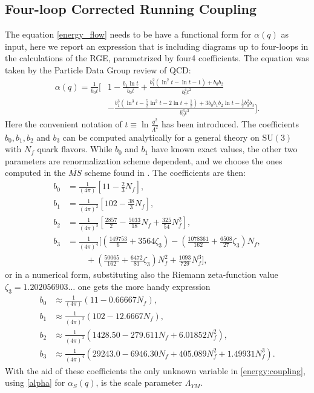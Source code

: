 \subsection{Four-loop Corrected Running Coupling}
\label{sec:4loop}
The equation \cref{energy_flow} needs to be have a functional form for $\alpha(q)$ as input, here we report an expression that is including diagrams up to four-loops in the calculations of the RGE, parametrized by four4 coefficients. The equation was taken by the Particle Data Group review of QCD\cite{dissertori_9._2016-1}:
\begin{align}
    \label{alpha}
    \alpha(q) = \frac{1}{b_0t} \bigg[& 1 - \frac{b_1\ln t}{b_0t}  + \frac{b_1^2(\ln^2t - \ln t - 1) + b_0b_2}{b_0^4t^2}\\\nonumber
    & - \frac{b_1^3(\ln^3t - \frac{5}{2}\ln^2 t - 2\ln t + \frac{1}{2}) + 3b_0b_1b_2\ln t - \frac{1}{2}b_0^2b_3}{b_0^6t^3}\bigg].
\end{align}
Here the convenient notation of $t\equiv\ln\frac{q^2}{\Lambda^2}$ has been introduced. The coefficients $b_0, b_1,b_2$ and $b_3$ can be computed analytically for a general theory on $\mathrm{SU}(3)$ with $N_f$ quark flavors. While $b_0$ and $b_1$ have known exact values, the other two parameters are renormalization scheme dependent, and we choose the ones computed in the $\overline{MS}$ scheme found in \cite{van_ritbergen_four-loop_1997}. The coefficients are then: 
\begin{align}
    b_0 &= \frac{1}{(4\pi)}   \left[11 - \frac{2}{3}N_f\right], \\\nonumber
    b_1 &= \frac{1}{(4\pi)^2} \left[102 - \frac{38}{3}N_f\right] ,\\\nonumber
    b_2 &= \frac{1}{(4\pi)^3} \left[\frac{2857}{2} - \frac{5033}{18}N_f + \frac{325}{54}N_f^2\right] ,\\\nonumber
    b_3 &= \frac{1}{(4\pi)^4} \bigg[\left(\frac{149753}{6} + 3564\zeta_3\right)  - \left(\frac{1078361}{162}+ \frac{6508}{27}\zeta_3\right) N_f , \\\nonumber
    & ~~~~~~~~~~+ \left(\frac{50065}{162}  + \frac{6472}{81}\zeta_3\right)N_f^2 + \frac{1093}{729}N_f^3 \bigg], 
\end{align} 
or in a numerical form, substituting also the Riemann zeta-function value $\zeta_3 = 1.202056903\dots$ one gets the more handy expression
\begin{align}
    \label{b:coeffs}
    b_0 &\approx \frac{1}{(4\pi)} (11-0.66667N_f),\\\nonumber
    b_1 &\approx \frac{1}{(4\pi)^2} (102-12.6667N_f),\\\nonumber
    b_2 &\approx \frac{1}{(4\pi)^3} (1428.50-279.611N_f+ 6.01852N_f^2),\\\nonumber
    b_3 &\approx \frac{1}{(4\pi)^4} (29243.0-6946.30N_f+ 405.089N_f^2+ 1.49931N_f^3).
\end{align}
With the aid of these coefficients the only unknown variable in \cref{energy:coupling}, using \cref{alpha} for $\alpha_S(q)$, is the scale parameter $\Lambda_{YM}$.